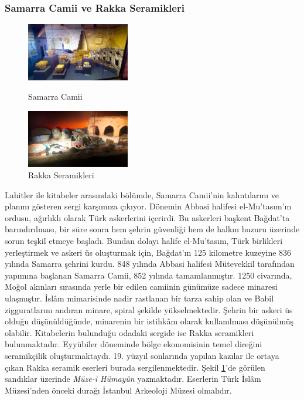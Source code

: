 \subsubsection{Samarra Camii ve Rakka Seramikleri}
\begin{figure}
    \includegraphics[width=0.4\textwidth]{assets/samarra.jpg}
    \caption{Samarra Camii}
    \label{fig:samarra}
    \vspace{10pt}
    \includegraphics[width=0.4\textwidth]{assets/raqqa.jpg}
    \caption{Rakka Seramikleri}
    \label{fig:raqqa}
\end{figure}
\indent Lahitler ile kitabeler arasındaki bölümde, Samarra Camii'nin kalıntılarını ve planını gösteren sergi karşımıza çıkıyor. Dönemin Abbasi halifesi el-Mu'tasım'ın ordusu, ağırlıklı olarak Türk askerlerini içerirdi. Bu askerleri başkent Bağdat'ta barındırılması, bir süre sonra hem şehrin güvenliği hem de halkın huzuru üzerinde sorun teşkil etmeye başladı. Bundan dolayı halife el-Mu'tasım, Türk birlikleri yerleştirmek ve askeri üs oluşturmak için, Bağdat'ın 125 kilometre kuzeyine 836 yılında Samarra şehrini kurdu. 848 yılında Abbasi halifesi Mütevekkil tarafından yapımına başlanan Samarra Camii, 852 yılında tamamlanmıştır. 1250 civarında, Moğol akınları sırasında yerle bir edilen camiinin günümüze sadece minaresi ulaşmıştır. İslâm mimarisinde nadir rastlanan bir tarza sahip olan ve Babil zigguratlarını andıran minare, spiral şekilde yükselmektedir. Şehrin bir askeri üs olduğu düşünüldüğünde, minarenin bir istihkâm olarak kullanılması düşünülmüş olabilir.\newline
\indent Kitabelerin bulunduğu odadaki sergide ise Rakka seramikleri bulunmaktadır. Eyyübiler döneminde bölge ekonomisinin temel direğini seramikçilik oluşturmaktaydı. 19. yüzyıl sonlarında yapılan kazılar ile ortaya çıkan Rakka seramik eserleri burada sergilenmektedir. Şekil \ref{fig:raqqa}'de görülen sandıklar üzerinde \textit{Müze-i Hümayûn} yazmaktadır. Eserlerin Türk İslâm Müzesi'nden önceki durağı İstanbul Arkeoloji Müzesi olmalıdır.\newline 
